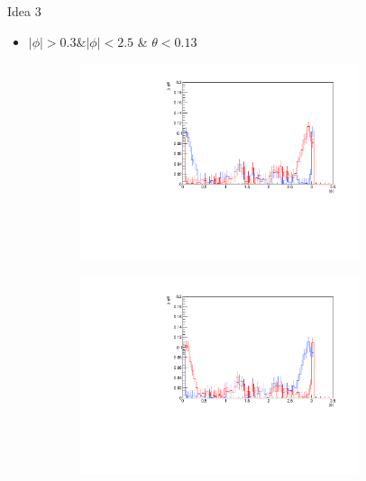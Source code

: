 \documentclass[11pt]{beamer}
\begin{document}
\begin{frame}{Idea 3}
\begin{itemize}
\item $|\phi| > 0.3 \& |\phi| < 2.5$ \& $\theta < 0.13$
\end{itemize}
\begin{figure}
\begin{subfigure}{0.45\textwidth}
\includegraphics[width=0.9\textwidth]{first/up_pdf/test_u/h_phi_test_SPi_combined.pdf}
\end{subfigure}
\begin{subfigure}{0.45\textwidth}
\includegraphics[width=0.9\textwidth]{first/down_pdf/test_d/h_phi_test_SPi_combined.pdf}
\end{subfigure}
\end{figure}
\end{frame}
\end{document}
